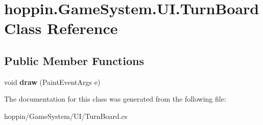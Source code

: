 \hypertarget{classhoppin_1_1_game_system_1_1_u_i_1_1_turn_board}{}\section{hoppin.\+Game\+System.\+U\+I.\+Turn\+Board Class Reference}
\label{classhoppin_1_1_game_system_1_1_u_i_1_1_turn_board}
\subsection*{Public Member Functions}
\begin{DoxyCompactItemize}
\item 
void {\bfseries draw} (Paint\+Event\+Args e)\hypertarget{classhoppin_1_1_game_system_1_1_u_i_1_1_turn_board_ad0a4585b0066bffe35ec3c8652a4cfe5}{}\label{classhoppin_1_1_game_system_1_1_u_i_1_1_turn_board_ad0a4585b0066bffe35ec3c8652a4cfe5}

\end{DoxyCompactItemize}


The documentation for this class was generated from the following file\+:\begin{DoxyCompactItemize}
\item 
hoppin/\+Game\+System/\+U\+I/Turn\+Board.\+cs\end{DoxyCompactItemize}
